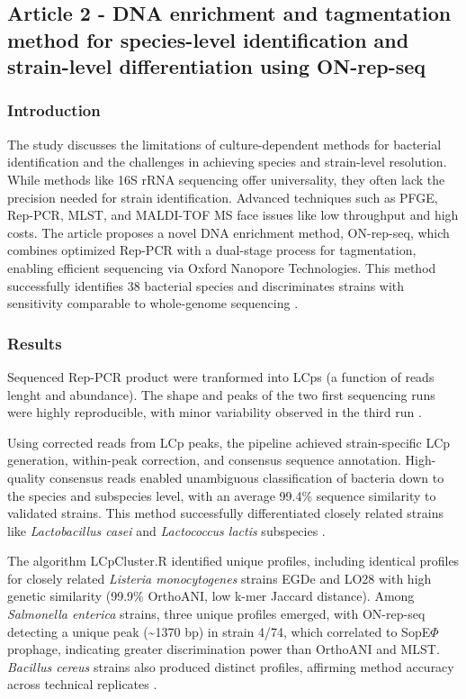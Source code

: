 \subsection{Article 2 - DNA enrichment and tagmentation method for species-level identification and strain-level differentiation using ON-rep-seq}
\subsubsection*{Introduction}
The study discusses the limitations of culture-dependent methods for bacterial identification and the challenges in achieving species and strain-level resolution. While methods like 16S rRNA sequencing offer universality, they often lack the precision needed for strain identification. Advanced techniques such as PFGE, Rep-PCR, MLST, and MALDI-TOF MS face issues like low throughput and high costs. The article proposes a novel DNA enrichment method, ON-rep-seq, which combines optimized Rep-PCR with a dual-stage process for tagmentation, enabling efficient sequencing via Oxford Nanopore Technologies. This method successfully identifies 38 bacterial species and discriminates strains with sensitivity comparable to whole-genome sequencing \cite*{L5-DNAEnrichment}.

\subsubsection*{Results}
Sequenced Rep-PCR product were tranformed into LCps (a function of reads lenght and abundance). The shape and peaks of the two first sequencing runs were highly reproducible, with minor variability observed in the third run \cite*{L5-DNAEnrichment}.

Using corrected reads from LCp peaks, the pipeline achieved strain-specific LCp generation, within-peak correction, and consensus sequence annotation. High-quality consensus reads enabled unambiguous classification of bacteria down to the species and subspecies level, with an average 99.4\% sequence similarity to validated strains. This method successfully differentiated closely related strains like \textit{Lactobacillus casei} and \textit{Lactococcus lactis} subspecies \cite*{L5-DNAEnrichment}.

The algorithm LCpCluster.R identified unique profiles, including identical profiles for closely related \textit{Listeria monocytogenes} strains EGDe and LO28 with high genetic similarity (99.9\% OrthoANI, low k-mer Jaccard distance). Among \textit{Salmonella enterica} strains, three unique profiles emerged, with ON-rep-seq detecting a unique peak (\textasciitilde1370 bp) in strain 4/74, which correlated to SopE$\Phi$ prophage, indicating greater discrimination power than OrthoANI and MLST. \textit{Bacillus cereus} strains also produced distinct profiles, affirming method accuracy across technical replicates \cite*{L5-DNAEnrichment}.

